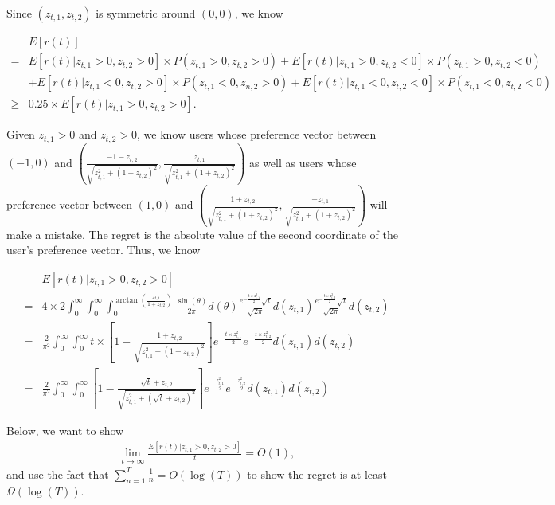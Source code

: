 \documentclass{article}
\begin{document}
Since $(z_{t,1}, z_{t,2})$ is symmetric around $(0,0)$, we know 

\begin{align}
&E[r(t)] \nonumber \\
= &E[r(t) | z_{t,1}>0,z_{t,2}>0] \times P(z_{t,1}>0,z_{t,2}>0) + E[r(t) |z_{t,1}>0,z_{t,2}<0] \times P(z_{t,1}>0,z_{t,2}<0) \nonumber \\
&+E[r(t) | z_{t,1}<0,z_{t,2}>0] \times P(z_{t,1}<0,z_{n,2}>0) + E[r(t) |z_{t,1}<0,z_{t,2}<0] \times P(z_{t,1}<0,z_{t,2}<0) \nonumber \\
\geq & 0.25 \times E[r(t) | z_{t,1}>0, z_{t,2}>0]. \nonumber
\end{align}

Given $z_{t,1}>0$ and $z_{t,2}>0$, we know users whose preference vector between $(-1,0)$ and $\left(\frac{-1-z_{t,2}}{\sqrt{z_{t,1}^2+(1+z_{t,2})^2}}, \frac{z_{t,1}}{\sqrt{z_{t,1}^2+(1+z_{t,2})^2}}\right)$ as well as users whose preference vector between $(1,0)$ and $\left(\frac{1+z_{t,2}}{\sqrt{z_{t,1}^2+(1+z_{t,2})^2}}, \frac{-z_{t,1}}{\sqrt{z_{t,1}^2+(1+z_{t,2})^2}}\right)$ will make a mistake. The regret is the absolute value of the second coordinate of the user's preference vector. Thus, we know

\begin{align}
&E[r(t)| z_{t,1}>0, z_{t,2}>0] \nonumber \\
=& 4\times 2 \int_{0}^{\infty} \int_{0}^{\infty} \int_{0}^{\arctan\left(\frac{z_{t,1}}{1+z_{t,2}}\right)}\frac{\sin(\theta)}{2\pi}d(\theta)\frac{e^{-\frac{t \times z_{t,1}^2}{2}}\sqrt{t}}{\sqrt{2\pi}}d(z_{t,1})\frac{e^{-\frac{t \times z_{t,2}^2}{2}}\sqrt{t}}{\sqrt{2\pi}}d(z_{t,2}) \nonumber \\
=& \frac{2}{\pi^2}\int_{0}^{\infty} \int_{0}^{\infty}t\times \left[1-\frac{1+z_{t,2}}{\sqrt{z_{t,1}^2+(1+z_{t,2})^2}}\right]e^{-\frac{t \times z_{t,1}^2}{2}}e^{-\frac{t \times z_{t,2}^2}{2}}d(z_{t,1})d(z_{t,2}) \nonumber \\
=& \frac{2}{\pi^2}\int_{0}^{\infty} \int_{0}^{\infty} \left[1-\frac{\sqrt{t}+z_{t,2}}{\sqrt{z_{t,1}^2+(\sqrt{t}+z_{t,2})^2}}\right]e^{-\frac{z_{t,1}^2}{2}}e^{-\frac{z_{t,2}^2}{2}}d(z_{t,1})d(z_{t,2}) \nonumber 
\end{align}

Below, we want to show 
\begin{align}
\lim_{t\rightarrow\infty}\frac{E[r(t)| z_{t,1}>0, z_{t,2}>0]}{t} = O(1), \nonumber
\end{align}
and use the fact that $\sum_{n=1}^{T}\frac{1}{n}=O(\log(T))$ to show the regret is at least $\Omega(\log(T))$.
\end{document}
